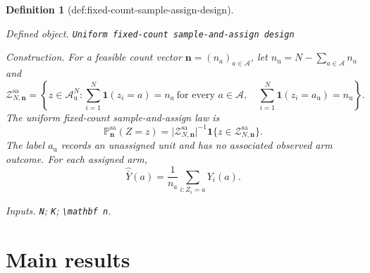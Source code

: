 \documentclass{article}
\newtheorem{definition}{Definition}
\begin{document}
\begin{definition}[def:fixed-count-sample-assign-design]\label{def:fixed-count-sample-assign-design}
\par\smallskip\noindent\emph{Defined object.} \texttt{Uniform fixed-\allowbreak{}count sample-\allowbreak{}and-\allowbreak{}assign design}
\par\smallskip\noindent\emph{Construction.} For a feasible count vector \(\mathbf n=(n_a)_{a\in\mathcal A}\), let \(n_{\mathrm u}=N-\sum_{a\in\mathcal A}n_a\) and
\[
\mathcal Z_{N,\mathbf n}^{\mathrm{sa}}
=\left\{z\in\mathcal A_{\mathrm u}^{N}:
\sum_{i=1}^{N}\mathbf 1(z_i=a)=n_a\ \text{for every }a\in\mathcal A,
\quad
\sum_{i=1}^{N}\mathbf 1(z_i=a_{\mathrm u})=n_{\mathrm u}
\right\}.
\]
The uniform fixed-count sample-and-assign law is
\[
\mathbb P_{\mathbf n}^{\mathrm{sa}}(Z=z)
=\lvert\mathcal Z_{N,\mathbf n}^{\mathrm{sa}}\rvert^{-1}
\mathbf 1\{z\in\mathcal Z_{N,\mathbf n}^{\mathrm{sa}}\}.
\]
The label \(a_{\mathrm u}\) records an unassigned unit and has no associated observed arm outcome. For each assigned arm,
\[
\widehat{\bar Y}(a)=\frac{1}{n_a}\sum_{i:Z_i=a}Y_i(a).
\]
\par\smallskip\noindent\emph{Inputs.} \texttt{N}; \texttt{K}; \texttt{\textbackslash{}\allowbreak{}mathbf n}.
\end{definition}

\section{Main results}
\end{document}
